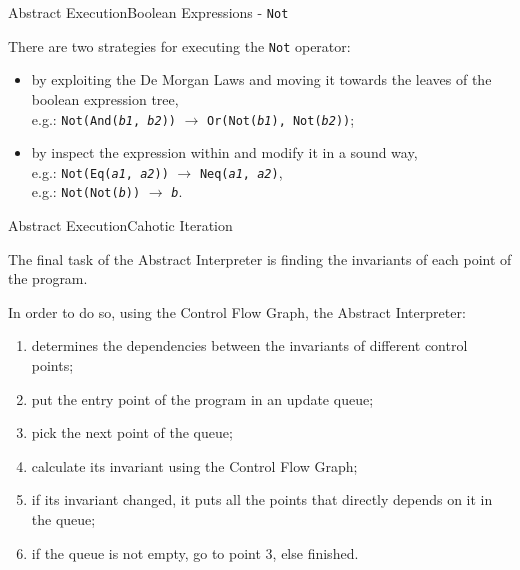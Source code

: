 \documentclass{beamer}
\begin{document}
\begin{frame}{Abstract Execution}{Boolean Expressions - \texttt{Not}}

    There are two strategies for executing the \texttt{Not} operator:
    \begin{itemize}
        \item by exploiting the De Morgan Laws and moving it towards the leaves of the boolean expression tree,\\
              e.g.: \texttt{Not(And(\textit{b1}, \textit{b2}))} $\rightarrow$ \texttt{Or(Not(\textit{b1}), Not(\textit{b2}))};
        \item by inspect the expression within and modify it in a sound way,\\
              e.g.: \texttt{Not(Eq(\textit{a1}, \textit{a2}))} $\rightarrow$ \texttt{Neq(\textit{a1}, \textit{a2})},\\
              e.g.: \texttt{Not(Not(\textit{b}))} $\rightarrow$ \texttt{\textit{b}}.
    \end{itemize}

\end{frame}

\begin{frame}{Abstract Execution}{Cahotic Iteration}

    The final task of the Abstract Interpreter is finding the invariants of each point of the program.

    In order to do so, using the Control Flow Graph, the Abstract Interpreter:
    \begin{enumerate}
        \item determines the dependencies between the invariants of different control points;
        \item put the entry point of the program in an update queue;
        \item pick the next point of the queue;
        \item calculate its invariant using the Control Flow Graph;
        \item if its invariant changed, it puts all the points that directly depends on it in the queue;
        \item if the queue is not empty, go to point 3, else finished.
    \end{enumerate}

\end{frame}

\end{document}
